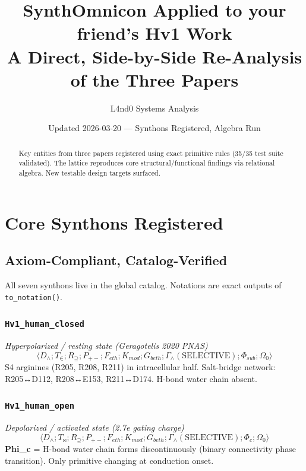 \documentclass[11pt, a4paper]{article}
\begin{document}
\title{\textbf{SynthOmnicon Applied to your friend's Hv1 Work}\\ \large A Direct, Side-by-Side Re-Analysis of the Three Papers}
\author{L4nd0 Systems Analysis}
\date{Updated 2026-03-20 — Synthons Registered, Algebra Run}
\maketitle

\begin{abstract}
\noindent Key entities from three papers registered using exact primitive rules (35/35 test suite validated). The lattice reproduces core structural/functional findings via relational algebra. New testable design targets surfaced.
\end{abstract}

\tableofcontents
\newpage

\section{Core Synthons Registered}
\subsection*{Axiom-Compliant, Catalog-Verified}
All seven synthons live in the global catalog. Notations are exact outputs of \texttt{to\_notation()}.

\subsubsection*{\texttt{Hv1\_human\_closed}}
\textit{Hyperpolarized / resting state (Geragotelis 2020 PNAS)}
\[
\langle D_\wedge; T_\in; R_\supseteq; P_{+-}; F_{eth}; K_{mod}; G_{beth}; \Gamma_\wedge(\text{SELECTIVE}); \Phi_{sub}; \Omega_0 \rangle
\]
S4 arginines (R205, R208, R211) in intracellular half. Salt-bridge network: R205↔D112, R208↔E153, R211↔D174. H-bond water chain absent.

\subsubsection*{\texttt{Hv1\_human\_open}}
\textit{Depolarized / activated state (2.7e gating charge)}
\[
\langle D_\wedge; T_\bowtie; R_\supseteq; P_{+-}; F_{eth}; K_{mod}; G_{beth}; \Gamma_\wedge(\text{SELECTIVE}); \Phi_c; \Omega_0 \rangle
\]
\textbf{Phi\_c} = H-bond water chain forms discontinuously (binary connectivity phase transition). Only primitive changing at conduction onset.
\end{document}
